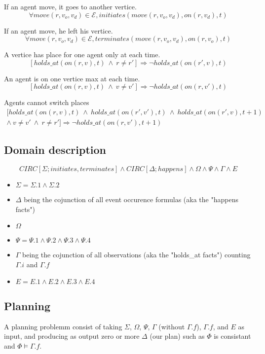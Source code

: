 If an agent move, it goes to another vertice.
\begin{equation}
  \tag{$\Sigma$.1}
  \forall move(r,v_o,v_d) \in \mathcal{E},initiates(move(r,v_o,v_d),on(r,v_d),t)
\end{equation}

If an agent move, he left his vertice.
\begin{equation}
  \tag{$\Sigma$.2}
  \forall move(r,v_o,v_d) \in \mathcal{E},terminates(move(r,v_o,v_d),on(r,v_o),t)
\end{equation}

A vertice has place for one agent only at each time.
\begin{equation}
  \tag{$\Psi$.2}
  [holds\_at(on(r,v),t)\ \land\ r\neq r']\Rightarrow \neg holds\_at(on(r',v),t)
\end{equation}

An agent is on one vertice max at each time.
\begin{equation}
  \tag{$\Psi$.3}
  [holds\_at(on(r,v),t)\ \land\ v\neq v']\Rightarrow \neg holds\_at(on(r,v'),t)
\end{equation}

Agents cannot switch places
\begin{multline}
  \tag{$\Psi$.4}
  [holds\_at(on(r,v),t)\ \land\ holds\_at(on(r',v'),t)\ \land\ holds\_at(on(r',v),t+1) \\ \land\ v\neq v'\ \land\ r\neq r'] \Rightarrow \neg holds\_at(on(r,v'),t+1)
\end{multline}

\subsection{Domain description}
\begin{equation}
  \tag{$\Phi$}
  CIRC[\Sigma;initiates,terminates] \land CIRC[\Delta;happens] \land \Omega \land \Psi \land \Gamma \land E
\end{equation}
\begin{itemize}
  \item $\Sigma = \Sigma.1 \land \Sigma.2$
  \item $\Delta$ being the cojunction of all event occurence formulas (aka the "happens facts")
  \item $\Omega$
  \item $\Psi = \Psi .1 \land \Psi .2 \land \Psi .3 \land \Psi .4$
  \item $\Gamma$ being the cojunction of all observations (aka the "holds\_at facts") counting $\Gamma.i$ and $\Gamma.f$
  \item $E = E.1 \land E.2 \land E.3 \land E.4$
\end{itemize}

\subsection{Planning}

A planning problemm consist of taking $\Sigma$, $\Omega$, $\Psi$, $\Gamma$ (without $\Gamma.f$), $\Gamma.f$, and $E$ as input,
and producing as output zero or more $\Delta$ (our plan) such as $\Phi$ is consistant and $\Phi\models\Gamma.f$.
